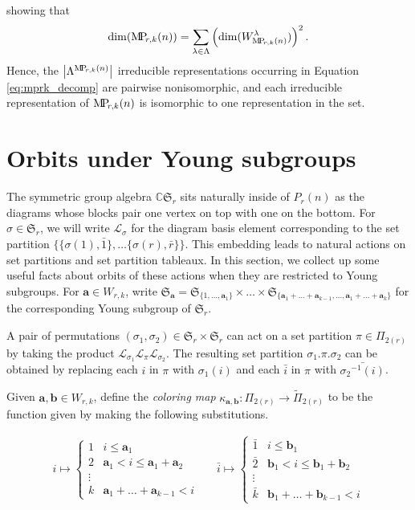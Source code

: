 \documentclass[ALCO,Unicode,published]{cedram}
\newcommand{\C}{\mathbb{C}}
\newcommand{\LL}{\mathcal{L}}
\newcommand{\SG}{\mathfrak{S}}
\newcommand{\bfa}{{\boldsymbol{a}}}
\newcommand{\bfb}{{\boldsymbol{b}}}
\newcommand{\MP}{{\rm M\!P\!}}
\newcommand{\ov}[1]{\bar{#1}}
\newcommand{\abs}[1]{\left| #1\right |}
\newcommand{\defn}[1]{\textcolor{defncolor}{\emph{#1}}}
\begin{document}
showing that \begin{align*}
    \dim(\MP_{r,k}(n))=\sum_{\lambda\in\Lambda}\left(\dim(W_{\MP_{r,k}(n)}^\lambda)\right)^2.
\end{align*} Hence, the $\abs{\Lambda^{\MP_{r,k}(n)}}$ irreducible representations occurring in Equation \ref{eq:mprk_decomp} are pairwise nonisomorphic, and each irreducible representation of $\MP_{r,k}(n)$ is isomorphic to one representation in the set.

\section{Orbits under Young subgroups}\label{sec:orbits}

The symmetric group algebra $\C\SG_r$ sits naturally inside of $P_r(n)$ as the diagrams whose blocks pair one vertex on top with one on the bottom. For $\sigma\in\SG_r$, we will write $\LL_\sigma$ for the diagram basis element corresponding to the set partition $\{\{\sigma(1),\ov1\},\dots\{\sigma(r),\ov{r}\}\}$. This embedding leads to natural actions on set partitions and set partition tableaux. In this section, we collect up some useful facts about orbits of these actions when they are restricted to Young subgroups. For $\bfa\in W_{r,k}$, write $\SG_\bfa=\SG_{\{1,\dots,\bfa_1\}}\times\dots\times\SG_{\{\bfa_1+\dots+\bfa_{k-1},\dots,\bfa_1+\dots+\bfa_k\}}$ for the corresponding Young subgroup of $\SG_r$.

A pair of permutations $(\sigma_1,\sigma_2)\in \SG_r\times\SG_r$ can act on a set partition $\pi\in\Pi_{2(r)}$ by taking the product $\LL_{\sigma_1}\LL_{\pi}\LL_{\sigma_2}$. The resulting set partition $\sigma_1.\pi.\sigma_2$ can be obtained by replacing each $i$ in $\pi$ with $\sigma_1(i)$ and each $\ov{i}$ in $\pi$ with $\ov{{\sigma_2}^{-1}(i)}$.

Given $\bfa,\bfb\in W_{r,k}$, define the \defn{coloring map} $\kappa_{\bfa,\bfb}:\Pi_{2(r)}\to\tilde\Pi_{2(r)}$ to be the function given by making the following substitutions.

\begin{align*}
    i \mapsto \begin{cases}
        1 & i\leq \bfa_1\\
        2 & \bfa_1<i\leq \bfa_1+\bfa_2\\
        \vdots\\
        k & \bfa_1+\dots+\bfa_{k-1}<i
    \end{cases} && \ov i \mapsto \begin{cases}
        \ov1 & i\leq \bfb_1\\
        \ov2 & \bfb_1<i\leq \bfb_1+\bfb_2\\
        \vdots\\
        \ov k & \bfb_1+\dots+\bfb_{k-1}<i
    \end{cases}
\end{align*}
\end{document}
